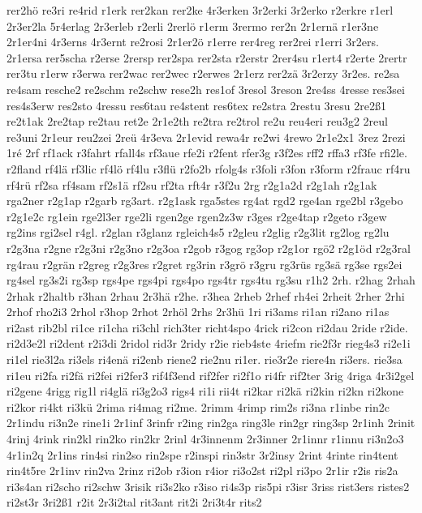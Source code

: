 {rer2hö
re3ri
re4rid
r1erk
rer2kan
rer2ke
4r3erken
3r2erki
3r2erko
r2erkre
r1erl
2r3er2la
5r4erlag
2r3erleb
r2erli
2rerlö
r1erm
3rermo
rer2n
2r1ernä
r1er3ne
2r1er4ni
4r3erns
4r3ernt
re2rosi
2r1er2ö
r1erre
rer4reg
rer2rei
r1erri
3r2ers.
2r1ersa
rer5scha
r2erse
2rersp
rer2spa
rer2sta
r2erstr
2rer4su
r1ert4
r2erte
2rertr
rer3tu
r1erw
r3erwa
rer2wac
rer2wec
r2erwes
2r1erz
rer2zä
3r2erzy
3r2es.
re2sa
re4sam
resche2
re2schm
re2schw
rese2h
res1of
3resol
3reson
2re4ss
4resse
res3sei
res4s3erw
res2sto
4ressu
res6tau
re4stent
res6tex
re2stra
2restu
3resu
2re2ß1
re2t1ak
2re2tap
re2tau
ret2e
2r1e2th
re2tra
re2trol
re2u
reu4eri
reu3g2
2reul
re3uni
2r1eur
reu2zei
2reü
4r3eva
2r1evid
rewa4r
re2wi
4rewo
2r1e2x1
3rez
2rezi
1ré
2rf
rf1ack
r3fahrt
rfall4s
rf3aue
rfe2i
r2fent
rfer3g
r3f2es
rff2
rffa3
rf3fe
rfi2le.
r2fland
rf4lä
rf3lic
rf4lö
rf4lu
r3flü
r2fo2b
rfolg4s
r3foli
r3fon
r3form
r2frauc
rf4ru
rf4rü
rf2sa
rf4sam
rf2s1ä
rf2su
rf2ta
rft4r
r3f2u
2rg
r2g1a2d
r2g1ah
r2g1ak
rga2ner
r2g1ap
r2garb
rg3art.
r2g1ask
rga5stes
rg4at
rgd2
rge4an
rge2bl
r3gebo
r2g1e2c
rg1ein
rge2l3er
rge2li
rgen2ge
rgen2z3w
r3ges
r2ge4tap
r2geto
r3gew
rg2ins
rgi2sel
r4gl.
r2glan
r3glanz
rgleich4s5
r2gleu
r2glig
r2g3lit
rg2log
rg2lu
r2g3na
r2gne
r2g3ni
r2g3no
r2g3oa
r2gob
r3gog
rg3op
r2g1or
rgö2
r2g1öd
r2g3ral
rg4rau
r2grän
r2greg
r2g3res
r2gret
rg3rin
r3grö
r3gru
rg3rüs
rg3sä
rg3se
rgs2ei
rg4sel
rg3s2i
rg3sp
rgs4pe
rgs4pi
rgs4po
rgs4tr
rgs4tu
rg3su
r1h2
2rh.
r2hag
2rhah
2rhak
r2haltb
r3han
2rhau
2r3hä
r2he.
r3hea
2rheb
2rhef
rh4ei
2rheit
2rher
2rhi
2rhof
rho2i3
2rhol
r3hop
2rhot
2rhöl
2rhs
2r3hü
1ri
ri3ams
ri1an
ri2ano
ri1as
ri2ast
rib2bl
ri1ce
ri1cha
ri3chl
rich3ter
richt4spo
4rick
ri2con
ri2dau
2ride
r2ide.
ri2d3e2l
ri2dent
r2i3di
2ridol
rid3r
2ridy
r2ie
rieb4ste
4riefm
rie2f3r
rieg4s3
ri2e1i
ri1el
rie3l2a
ri3els
ri4enä
ri2enb
riene2
rie2nu
ri1er.
rie3r2e
riere4n
ri3ers.
rie3sa
ri1eu
ri2fa
ri2fä
ri2fei
ri2fer3
rif4f3end
rif2fer
ri2f1o
ri4fr
rif2ter
3rig
4riga
4r3i2gel
ri2gene
4rigg
rig1l
ri4glä
ri3g2o3
rigs4
ri1i
rii4t
ri2kar
ri2kä
ri2kin
ri2kn
ri2kone
ri2kor
ri4kt
ri3kü
2rima
ri4mag
ri2me.
2rimm
4rimp
rim2s
ri3na
r1inbe
rin2c
2r1indu
ri3n2e
rine1i
2r1inf
3rinfr
r2ing
rin2ga
ring3le
rin2gr
ring3sp
2r1inh
2rinit
4rinj
4rink
rin2kl
rin2ko
rin2kr
2rinl
4r3innenm
2r3inner
2r1innr
r1innu
ri3n2o3
4r1in2q
2r1ins
rin4si
rin2so
rin2spe
r2inspi
rin3str
3r2insy
2rint
4rinte
rin4tent
rin4t5re
2r1inv
rin2va
2rinz
ri2ob
r3ion
r4ior
ri3o2st
ri2pl
ri3po
2r1ir
r2is
ris2a
ri3s4an
ri2scho
ri2schw
3risik
ri3s2ko
r3iso
ri4s3p
ris5pi
r3isr
3riss
rist3ers
ristes2
ri2st3r
3ri2ß1
r2it
2r3i2tal
rit3ant
rit2i
2ri3t4r
rits2
}
